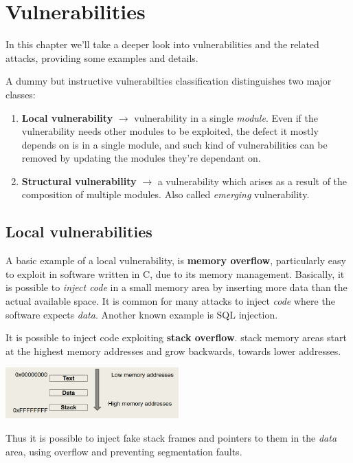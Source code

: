 \chapter{Vulnerabilities}
In this chapter we'll take a deeper look into vulnerabilities and the related attacks,
providing some examples and details.\nl

A dummy but instructive vulnerabilties classification distinguishes two major classes:
\begin{enumerate}
    \item \textbf{Local vulnerability} $\rightarrow$ vulnerability in a single \textit{module}.
    Even if the vulnerability needs other modules to be exploited, the defect it mostly depends on is in a single module, 
    and such kind of vulnerabilities can be removed by updating the modules they're dependant on.
    \item \textbf{Structural vulnerability} $\rightarrow$ a vulnerability which arises as a result of the composition of multiple modules.
    Also called \textit{emerging} vulnerability.
\end{enumerate}

\section{Local vulnerabilities}
A basic example of a local vulnerability, is \textbf{memory overflow},
particularly easy to exploit in software written in C, due to its memory management.
Basically, it is possible to \textit{inject code} in a small memory area by inserting more data than the actual available space.
It is common for many attacks to inject \textit{code} where the software expects \textit{data}.
Another known example is SQL injection.\nl

It is possible to inject code exploiting \textbf{stack overflow}.
stack memory areas start at the highest memory addresses and grow backwards, towards lower addresses.
\begin{center}
\includegraphics[width=0.5\textwidth]{images/stack_overflow.png}
\end{center}
Thus it is possible to inject fake stack frames and pointers to them in the \textit{data} area, using overflow and preventing segmentation faults.


